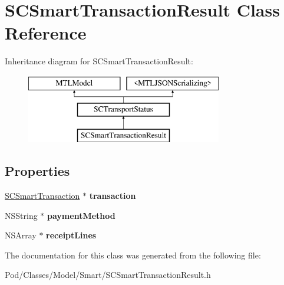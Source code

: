 \hypertarget{interface_s_c_smart_transaction_result}{}\section{S\+C\+Smart\+Transaction\+Result Class Reference}
\label{interface_s_c_smart_transaction_result}
Inheritance diagram for S\+C\+Smart\+Transaction\+Result\+:\begin{figure}[H]
\begin{center}
\leavevmode
\includegraphics[height=3.000000cm]{interface_s_c_smart_transaction_result}
\end{center}
\end{figure}
\subsection*{Properties}
\begin{DoxyCompactItemize}
\item 
\hyperlink{interface_s_c_smart_transaction}{S\+C\+Smart\+Transaction} $\ast$ {\bfseries transaction}\hypertarget{interface_s_c_smart_transaction_result_a9e6680919160a484f5c3045291cdd4bf}{}\label{interface_s_c_smart_transaction_result_a9e6680919160a484f5c3045291cdd4bf}

\item 
N\+S\+String $\ast$ {\bfseries payment\+Method}\hypertarget{interface_s_c_smart_transaction_result_a7c81ac3c438472e0e8b90fece08ca592}{}\label{interface_s_c_smart_transaction_result_a7c81ac3c438472e0e8b90fece08ca592}

\item 
N\+S\+Array $\ast$ {\bfseries receipt\+Lines}\hypertarget{interface_s_c_smart_transaction_result_a76b0a8165b487e2a1446e188d08e0196}{}\label{interface_s_c_smart_transaction_result_a76b0a8165b487e2a1446e188d08e0196}

\end{DoxyCompactItemize}


The documentation for this class was generated from the following file\+:\begin{DoxyCompactItemize}
\item 
Pod/\+Classes/\+Model/\+Smart/S\+C\+Smart\+Transaction\+Result.\+h\end{DoxyCompactItemize}
